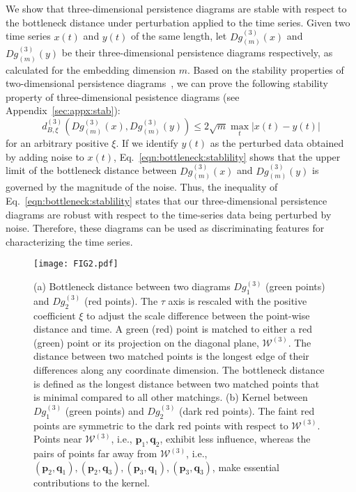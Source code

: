 \documentclass[twocolumn,pre,amsmath,amssymb]{revtex4-1}
\newcommand{\bp}{\ensuremath{\boldsymbol{p}}}
\newcommand{\bq}{\ensuremath{\boldsymbol{q}}}
\begin{document}
We show that three-dimensional persistence diagrams are stable with respect to the bottleneck distance under perturbation applied to the time series.
Given two time series $x(t)$ and $y(t)$ of the same length, 
let $Dg_{(m)}^{(3)}(x)$ and $Dg_{(m)}^{(3)}(y)$ be their three-dimensional persistence diagrams 
respectively, as calculated for the embedding dimension $m$.
Based on the stability properties of two-dimensional persistence diagrams~\cite{chazal:stability:2014}, 
we can prove the following stability property of three-dimensional pesistence diagrams (see Appendix~\ref{sec:appx:stab}):
\begin{equation}\label{eqn:bottleneck:stablility}
d^{(3)}_{B, \xi}(Dg_{(m)}^{(3)}(x),Dg_{(m)}^{(3)}(y)) \leq 2\sqrt{m}\max_{t}|x(t)-y(t)|
\end{equation}
for an arbitrary positive $\xi$.
If we identify $y(t)$ as the perturbed data obtained by adding noise to $x(t)$,
Eq.~\eqref{eqn:bottleneck:stablility} shows that the upper limit of 
the bottleneck distance between $Dg_{(m)}^{(3)}(x)$ and $Dg_{(m)}^{(3)}(y)$ 
is governed by the magnitude of the noise.
Thus, the inequality of Eq.~\eqref{eqn:bottleneck:stablility} states that 
our three-dimensional persistence diagrams are robust with respect 
to the time-series data being perturbed by noise.
Therefore, these diagrams can be used as discriminating features for characterizing the time series.
\begin{figure}
	\texttt{[image: FIG2.pdf]}
	\protect\caption{(a) Bottleneck distance 
		between two diagrams $Dg_1^{(3)}$ (green points) and $Dg_2^{(3)}$ (red points). The $\tau$ axis is rescaled with the positive coefficient $\xi$ to adjust the scale difference between the point-wise distance and time. A green (red) point is matched to either a red (green) point or its projection on the diagonal plane, $\mathcal{W}^{(3)}$. 
		The distance between two matched points is the longest edge of their differences along any coordinate dimension.
		The bottleneck distance is defined as the longest distance between two matched points that is minimal compared to all other matchings.
		(b) Kernel between 
		$Dg_1^{(3)}$ (green points) and $Dg_2^{(3)}$ (dark red points). 
		The faint red points are symmetric to the dark red points with respect to $\mathcal{W}^{(3)}$. 
	    Points near $\mathcal{W}^{(3)}$, i.e., $\bp_1, \bq_2$, exhibit less influence, 
		whereas the pairs of points far away from $\mathcal{W}^{(3)}$, 
		i.e., $(\bp_2, \bq_1), (\bp_2, \bq_3), (\bp_3, \bq_1), (\bp_3, \bq_3)$,
		make essential contributions to the kernel.
		\label{fig:bottleneck}}
\end{figure}
\end{document}
